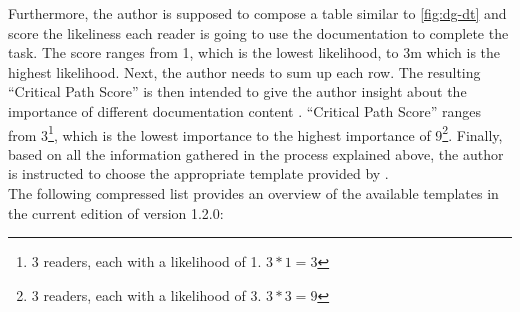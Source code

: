 \noindent
Furthermore, the author is supposed to compose a table similar to \cref{fig:dg-dt} and score the likeliness each reader is
going to use the documentation to complete the task.
The score ranges from 1, which is the lowest likelihood, to 3m which is the highest likelihood.
Next, the author needs to sum up each row.
The resulting ``Critical Path Score'' is then intended to give the author insight about the importance of different documentation
content \cite{shorterGoodDocsProject2024}.
``Critical Path Score'' ranges from 3\footnote{3 readers, each with a likelihood of 1. $3*1=3$},
which is the lowest importance to the highest importance of 9\footnote{3 readers, each with a likelihood of 3. $3*3=9$}.
Finally, based on all the information gathered in the process explained above, the author is instructed to choose the appropriate template provided by \good\space \cite{shorterGoodDocsProject2024}.\\
The following compressed list provides an overview of the available templates in the current edition of \good\space version 1.2.0:
